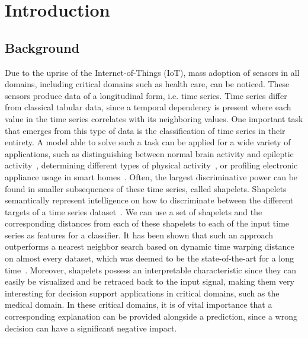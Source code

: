 \documentclass[runningheads]{llncs}
\begin{document}
\section{Introduction} \label{sec:intro}

\subsection{Background}
Due to the uprise of the Internet-of-Things (IoT), mass adoption of sensors in all domains, including critical domains such as health care, can be noticed. These sensors produce data of a longitudinal form, i.e. time series. Time series differ from classical tabular data, since a temporal dependency is present where each value in the time series correlates with its neighboring values. One important task that emerges from this type of data is the classification of time series in their entirety. A model able to solve such a task can be applied for a wide variety of applications, such as distinguishing between normal brain activity and epileptic activity~\citep{chaovalitwongse2006electroencephalogram}, determining different types of physical activity~\citep{liu2015sensor}, or profiling electronic appliance usage in smart homes~\citep{li2016profiling}. Often, the largest discriminative power can be found in smaller subsequences of these time series, called shapelets. Shapelets semantically represent intelligence on how to discriminate between the different targets of a time series dataset~\citep{grabocka2014learning}. We can use a set of shapelets and the corresponding distances from each of these shapelets to each of the input time series as features for a classifier. It has been shown that such an approach outperforms a nearest neighbor search based on dynamic time warping distance on almost every dataset, which was deemed to be the state-of-the-art for a long time~\citep{abanda2019review}. Moreover, shapelets possess an interpretable characteristic since they can easily be visualized and be retraced back to the input signal, making them very interesting for decision support applications in critical domains, such as the medical domain. In these critical domains, it is of vital importance that a corresponding explanation can be provided alongside a prediction, since a wrong decision can have a significant negative impact.
\end{document}
